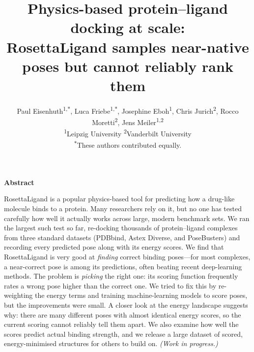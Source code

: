 \documentclass[11pt]{article}
\title{\vspace{-1.5em}Physics-based protein--ligand docking at scale:\\
RosettaLigand samples near-native poses but cannot reliably rank them}
\author{%
  Paul Eisenhuth\textsuperscript{1,$\ast$}, Luca Friebe\textsuperscript{1,$\ast$},
  Josephine Eboh\textsuperscript{1},
  Chris Jurich\textsuperscript{2}, Rocco Moretti\textsuperscript{2},
  Jens Meiler\textsuperscript{1,2}\\[0.7em]
  {\small\textsuperscript{1}Leipzig University \qquad
   \textsuperscript{2}Vanderbilt University}\\[0.3em]
  {\small\textsuperscript{$\ast$}These authors contributed equally.}}
\date{}
\begin{document}
\maketitle
\vspace{-2.5em}

\begin{center}
\large\textbf{Abstract}
\end{center}

\noindent
RosettaLigand is a popular physics-based tool for predicting how a drug-like
molecule binds to a protein. Many researchers rely on it, but no one has tested
carefully how well it actually works across large, modern benchmark sets. We ran
the largest such test so far, re-docking thousands of protein--ligand complexes
from three standard datasets (PDBbind, Astex Diverse, and PoseBusters) and
recording every predicted pose along with its energy scores. We find that
RosettaLigand is very good at \emph{finding} correct binding poses---for most
complexes, a near-correct pose is among its predictions, often beating recent
deep-learning methods. The problem is \emph{picking} the right one: its scoring
function frequently rates a wrong pose higher than the correct one. We tried to
fix this by re-weighting the energy terms and training machine-learning models to
score poses, but the improvements were small. A closer look at the energy
landscape suggests why: there are many different poses with almost identical
energy scores, so the current scoring cannot reliably tell them apart. We also
examine how well the scores predict actual binding strength, and we release a
large dataset of scored, energy-minimised structures for others to build on.
\emph{(Work in progress.)}
\end{document}
